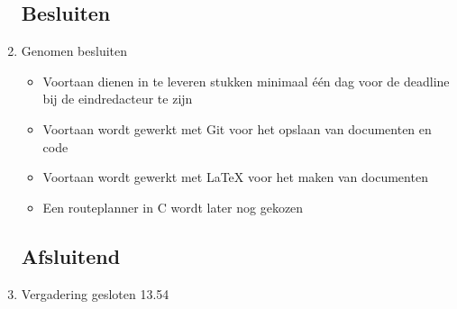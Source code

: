 \documentclass{article}
\begin{document}
\begin{enumerate}
	\subsection*{Besluiten}
	\item Genomen besluiten
	\begin{itemize}
		\item Voortaan dienen in te leveren stukken minimaal één dag voor de deadline bij de eindredacteur te zijn
		\item Voortaan wordt gewerkt met Git voor het opslaan van documenten en code
		\item Voortaan wordt gewerkt met LaTeX voor het maken van documenten
		\item Een routeplanner in C wordt later nog gekozen
	\end{itemize}

	\noindent 
	\subsection*{Afsluitend}
	\item Vergadering gesloten 13.54

\end{enumerate}
\end{document}
